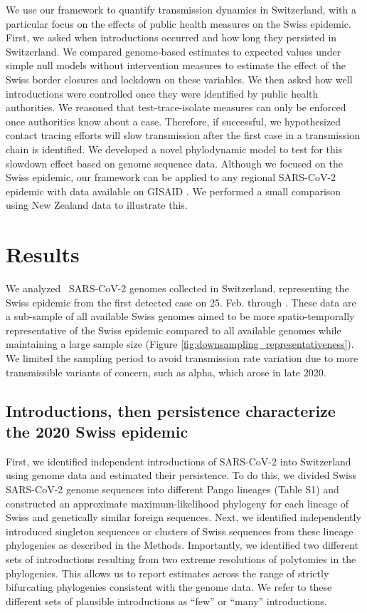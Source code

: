 \documentclass[11pt,twoside,lineno]{pnas-new} %
\begin{document}
We use our framework to quantify transmission dynamics in Switzerland, with a particular focus on the effects of public health measures on the Swiss epidemic. First, we asked when introductions occurred and how long they persisted in Switzerland. We compared genome-based estimates to expected values under simple null models without intervention measures to estimate the effect of the Swiss border closures and lockdown on these variables. We then asked how well introductions were controlled once they were identified by public health authorities. We reasoned that test-trace-isolate measures can only be enforced once authorities know about a case. Therefore, if successful, we hypothesized contact tracing efforts will slow transmission after the first case in a transmission chain is identified. We developed a novel phylodynamic model to test for this slowdown effect based on genome sequence data. Although we focused on the Swiss epidemic, our framework can be applied to any regional SARS-CoV-2 epidemic with data available on GISAID \cite{GISAID}. We performed a small comparison using New Zealand data to illustrate this. 

\section{Results}
We analyzed \nfocalsamples\ SARS-CoV-2 genomes collected in Switzerland, representing the Swiss epidemic from the first detected case on 25. Feb. through \maxdate. These data are a sub-sample of all available Swiss genomes aimed to be more spatio-temporally representative of the Swiss epidemic compared to all available genomes while maintaining a large sample size (Figure  \ref{fig:downsampling_representativeness}). We limited the sampling period to avoid transmission rate variation due to more transmissible variants of concern, such as alpha, which arose in late 2020.

\subsection{Introductions, then persistence characterize the 2020 Swiss epidemic}

First, we identified independent introductions of SARS-CoV-2 into Switzerland using genome data and estimated their persistence. To do this, we divided Swiss SARS-CoV-2 genome sequences into different Pango lineages (Table S1) and constructed an approximate maximum-likelihood phylogeny for each lineage of Swiss and genetically similar foreign sequences. Next, we identified independently introduced singleton sequences or clusters of Swiss sequences from these lineage phylogenies as described in the Methods. Importantly, we identified two different sets of introductions resulting from two extreme resolutions of polytomies in the phylogenies. This allows us to report estimates across the range of strictly bifurcating phylogenies consistent with the genome data. We refer to these different sets of plausible introductions as ``few'' or ``many'' introductions.
\end{document}
